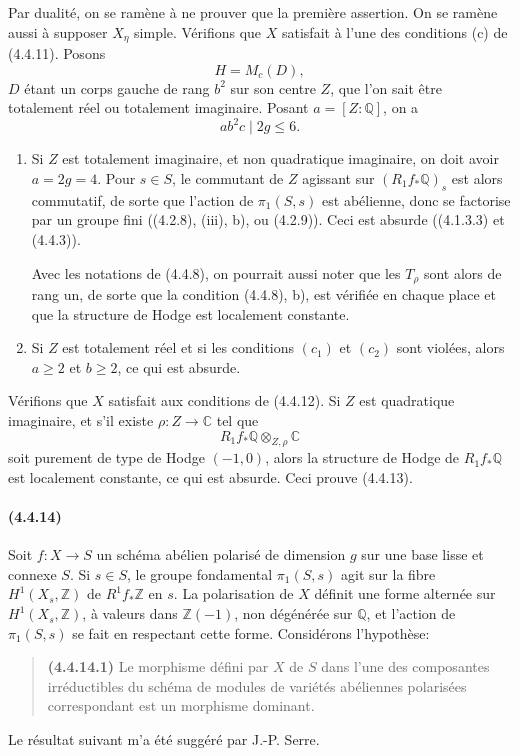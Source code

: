 \documentclass[10pt]{article}
\newcommand{\C}{\mathbb C}
\newcommand{\Q}{\mathbb Q}
\newcommand{\Z}{\mathbb Z}
\begin{document}
Par dualité, on se ramène à ne prouver que la première assertion. On se ramène aussi à supposer $X_\eta$ simple. Vérifions que $X$ satisfait à l'une des conditions (c) de (4.4.11). Posons
\[
H=M_c(D),
\]
$D$ étant un corps gauche de rang $b^2$ sur son centre $Z$, que l'on sait être totalement réel ou totalement imaginaire. Posant $a=[Z:\Q]$, on a
\[
\tag{4.4.13.1}
ab^2c\mid 2g\le6.
\]

\begin{enumerate}[label=\arabic*)]
\item Si $Z$ est totalement imaginaire, et non quadratique imaginaire, on doit avoir $a=2g=4$. Pour $s\in S$, le commutant de $Z$ agissant sur $(R_1f_*\Q)_s$ est alors commutatif, de sorte que l'action de $\pi_1(S,s)$ est abélienne, donc se factorise par un groupe fini ((4.2.8), (iii), b), ou (4.2.9)). Ceci est absurde ((4.1.3.3) et (4.4.3)).

Avec les notations de (4.4.8), on pourrait aussi noter que les $T_\rho$ sont alors de rang un, de sorte que la condition (4.4.8), b), est vérifiée en chaque place et que la structure de Hodge est localement constante.

\item Si $Z$ est totalement réel et si les conditions $(c_1)$ et $(c_2)$ sont violées, alors $a\ge2$ et $b\ge2$, ce qui est absurde.
\end{enumerate}

Vérifions que $X$ satisfait aux conditions de (4.4.12). Si $Z$ est quadratique imaginaire, et s'il existe $\rho:Z\to\C$ tel que
\[
R_1f_*\Q\otimes_{Z,\rho}\C
\]
soit purement de type de Hodge $(-1,0)$, alors la structure de Hodge de $R_1f_*\Q$ est localement constante, ce qui est absurde. Ceci prouve (4.4.13).

\paragraph{(4.4.14)} Soit $f:X\to S$ un schéma abélien polarisé de dimension $g$ sur une base lisse et connexe $S$. Si $s\in S$, le groupe fondamental $\pi_1(S,s)$ agit sur la fibre $H^1(X_s,\Z)$ de $R^1f_*\Z$ en $s$. La polarisation de $X$ définit une forme alternée sur $H^1(X_s,\Z)$, à valeurs dans $\Z(-1)$, non dégénérée sur $\Q$, et l'action de $\pi_1(S,s)$ se fait en respectant cette forme. Considérons l'hypothèse:
\begin{quote}
\noindent\textbf{(4.4.14.1)} Le morphisme défini par $X$ de $S$ dans l'une des composantes irréductibles du schéma de modules de variétés abéliennes polarisées correspondant est un morphisme dominant.
\end{quote}
Le résultat suivant m'a été suggéré par J.-P. Serre.
\end{document}
